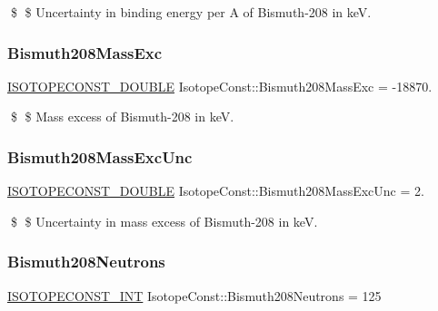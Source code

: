 \$ \$ Uncertainty in binding energy per A of Bismuth-\/208 in keV. \mbox{\label{group___isotope_const-_bismuth-_bi208_ga3b0a19e4060de80103b82520d961e371}} 
\subsubsection{\texorpdfstring{Bismuth208\+Mass\+Exc}{Bismuth208MassExc}}
{\footnotesize\ttfamily \mbox{\hyperlink{group___isotope_const-_macros_ga8f45a7272ce02c0b4c65c44636ed719a}{I\+S\+O\+T\+O\+P\+E\+C\+O\+N\+S\+T\+\_\+\+D\+O\+U\+B\+LE}} Isotope\+Const\+::\+Bismuth208\+Mass\+Exc = -\/18870.}

\$ \$ Mass excess of Bismuth-\/208 in keV. \mbox{\label{group___isotope_const-_bismuth-_bi208_ga06f25454a4ba7e07e56e6b0b39fbec52}} 
\subsubsection{\texorpdfstring{Bismuth208\+Mass\+Exc\+Unc}{Bismuth208MassExcUnc}}
{\footnotesize\ttfamily \mbox{\hyperlink{group___isotope_const-_macros_ga8f45a7272ce02c0b4c65c44636ed719a}{I\+S\+O\+T\+O\+P\+E\+C\+O\+N\+S\+T\+\_\+\+D\+O\+U\+B\+LE}} Isotope\+Const\+::\+Bismuth208\+Mass\+Exc\+Unc = 2.}

\$ \$ Uncertainty in mass excess of Bismuth-\/208 in keV. \mbox{\label{group___isotope_const-_bismuth-_bi208_ga40ab444ee61c20c12a0172e54779f983}} 
\subsubsection{\texorpdfstring{Bismuth208\+Neutrons}{Bismuth208Neutrons}}
{\footnotesize\ttfamily \mbox{\hyperlink{group___isotope_const-_macros_ga5f18360b3e99483a35c32d789e62621c}{I\+S\+O\+T\+O\+P\+E\+C\+O\+N\+S\+T\+\_\+\+I\+NT}} Isotope\+Const\+::\+Bismuth208\+Neutrons = 125}

